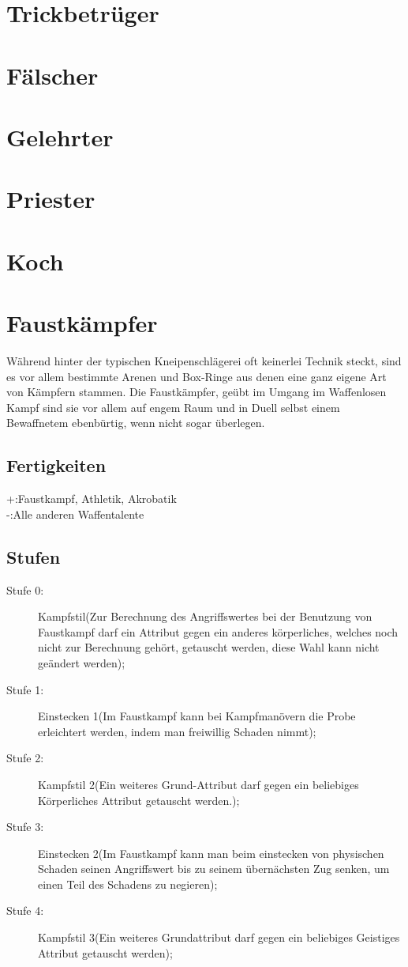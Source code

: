 \documentclass[a4paper,12pt,oneside]{book}
\begin{document}
\section{Trickbetrüger}
\section{Fälscher}
\section{Gelehrter}
\section{Priester}
\section{Koch}
\section{Faustkämpfer}
Während hinter der typischen Kneipenschlägerei oft keinerlei Technik steckt, sind es vor allem bestimmte Arenen und Box-Ringe aus denen eine ganz eigene Art von Kämpfern stammen. Die Faustkämpfer, geübt im Umgang im Waffenlosen Kampf sind sie vor allem auf engem Raum und in Duell selbst einem Bewaffnetem ebenbürtig, wenn nicht sogar überlegen.
\subsection{Fertigkeiten}
+:Faustkampf, Athletik, Akrobatik
\\-:Alle anderen Waffentalente 
\subsection{Stufen}
\begin{description}
\item[Stufe 0:]Kampfstil(Zur Berechnung des Angriffswertes bei der Benutzung von Faustkampf darf ein Attribut gegen ein anderes körperliches, welches noch nicht zur Berechnung gehört, getauscht werden, diese Wahl kann nicht geändert werden); 
\item[Stufe 1:]Einstecken 1(Im Faustkampf kann bei Kampfmanövern die Probe erleichtert werden, indem man freiwillig Schaden nimmt);
\item[Stufe 2:]Kampfstil 2(Ein weiteres Grund-Attribut darf gegen ein beliebiges Körperliches Attribut getauscht werden.);
\item[Stufe 3:]Einstecken 2(Im Faustkampf kann man beim einstecken von physischen Schaden seinen Angriffswert bis zu seinem übernächsten Zug senken, um einen Teil des Schadens zu negieren);
\item[Stufe 4:]Kampfstil 3(Ein weiteres Grundattribut darf gegen ein beliebiges Geistiges Attribut getauscht werden);
\end{description}
\end{document}
